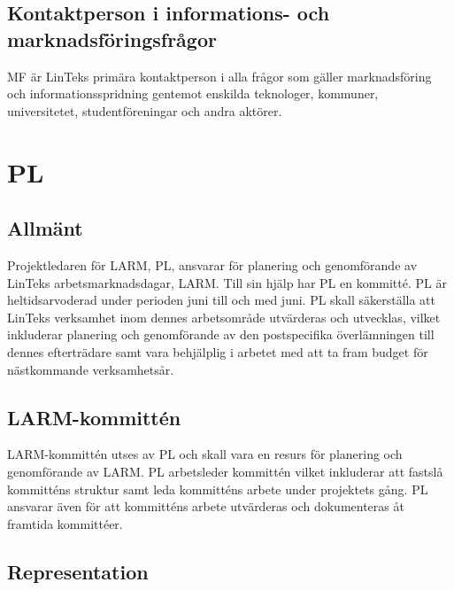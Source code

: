 \hypertarget{kontaktperson-i-informations--och-marknadsfuxf6ringsfruxe5gor}{%
\subsection{Kontaktperson i informations- och
marknadsföringsfrågor}\label{kontaktperson-i-informations--och-marknadsfuxf6ringsfruxe5gor}}

MF är LinTeks primära kontaktperson i alla frågor som gäller
marknadsföring och informationsspridning gentemot enskilda teknologer,
kommuner, universitetet, studentföreningar och andra aktörer.

\hypertarget{pl}{%
\section{PL}\label{pl}}

\hypertarget{allmuxe4nt-6}{%
\subsection{Allmänt}\label{allmuxe4nt-6}}

Projektledaren för LARM, PL, ansvarar för planering och genomförande av
LinTeks arbetsmarknadsdagar, LARM. Till sin hjälp har PL en kommitté. PL
är heltidsarvoderad under perioden juni till och med juni. PL skall
säkerställa att LinTeks verksamhet inom dennes arbetsområde utvärderas
och utvecklas, vilket inkluderar planering och genomförande av den
postspecifika överlämningen till dennes efterträdare samt vara
behjälplig i arbetet med att ta fram budget för nästkommande
verksamhetsår.

\hypertarget{larm-kommittuxe9n}{%
\subsection{LARM-kommittén}\label{larm-kommittuxe9n}}

LARM-kommittén utses av PL och skall vara en resurs för planering och
genomförande av LARM. PL arbetsleder kommittén vilket inkluderar att
fastslå kommitténs struktur samt leda kommitténs arbete under projektets
gång. PL ansvarar även för att kommitténs arbete utvärderas och
dokumenteras åt framtida kommittéer.

\hypertarget{representation}{%
\subsection{Representation}\label{representation}}

